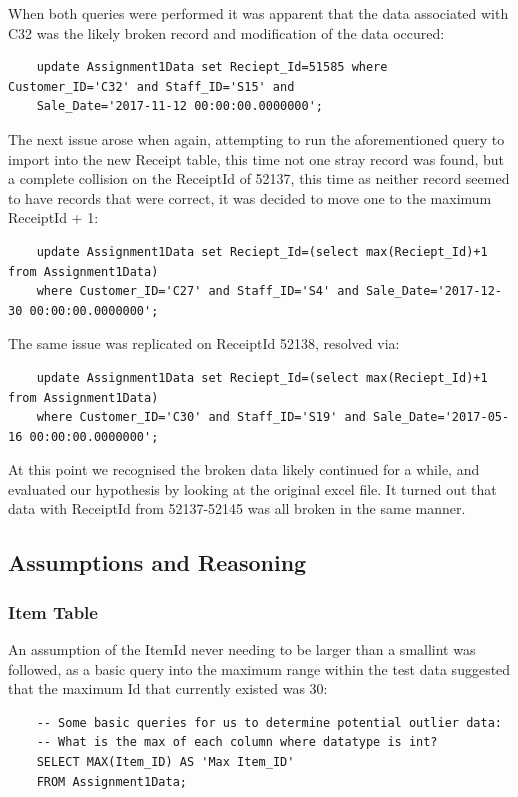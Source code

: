 \documentclass{article}
\begin{document}
            When both queries were performed it was apparent that the data associated with C32 was 
            the likely broken record and modification of the data occured:
            \begin{verbatim}
    update Assignment1Data set Reciept_Id=51585 where Customer_ID='C32' and Staff_ID='S15' and 
    Sale_Date='2017-11-12 00:00:00.0000000';
            \end{verbatim}
            The next issue arose when again, attempting to run the aforementioned query to import
            into the new Receipt table, this time not one stray record was found, but a complete
            collision on the ReceiptId of 52137, this time as neither record seemed to have 
            records that were correct, it was decided to move one to the maximum ReceiptId + 1:
            \begin{verbatim}
    update Assignment1Data set Reciept_Id=(select max(Reciept_Id)+1 from Assignment1Data) 
    where Customer_ID='C27' and Staff_ID='S4' and Sale_Date='2017-12-30 00:00:00.0000000';
            \end{verbatim}
            The same issue was replicated on ReceiptId 52138, resolved via:
            \begin{verbatim}
    update Assignment1Data set Reciept_Id=(select max(Reciept_Id)+1 from Assignment1Data) 
    where Customer_ID='C30' and Staff_ID='S19' and Sale_Date='2017-05-16 00:00:00.0000000';
            \end{verbatim}
            At this point we recognised the broken data likely continued for a while, and 
            evaluated our hypothesis by looking at the original excel file. It turned
            out that data with ReceiptId from 52137-52145 was all broken in the same manner.

        \subsection{Assumptions and Reasoning}
            \subsubsection{Item Table}
                An assumption of the ItemId never needing to be larger than a smallint
                was followed, as a basic query into the maximum range within the test data
                suggested that the maximum Id that currently existed was 30:
                \begin{verbatim}
    -- Some basic queries for us to determine potential outlier data:
    -- What is the max of each column where datatype is int?
    SELECT MAX(Item_ID) AS 'Max Item_ID'
    FROM Assignment1Data;
                \end{verbatim}
\end{document}
